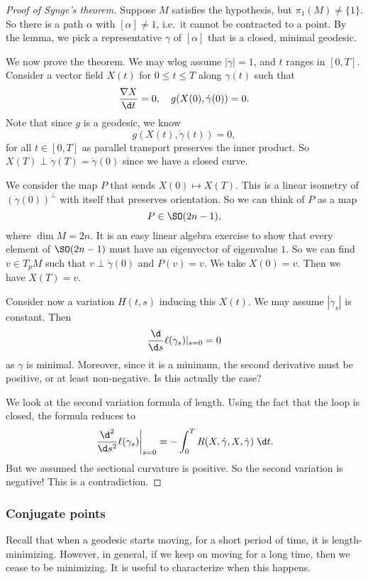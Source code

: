\documentclass[a4paper]{article}
\begin{document}
\begin{proof}[Proof of Synge's theorem]
  Suppose $M$ satisfies the hypothesis, but $\pi_1(M) \not= \{1\}$. So there is a path $\alpha$ with $[\alpha] \not= 1$, i.e.\ it cannot be contracted to a point. By the lemma, we pick a representative $\gamma$ of $[\alpha]$ that is a closed, minimal geodesic.

  We now prove the theorem. We may wlog assume $|\dot{\gamma}| = 1$, and $t$ ranges in $[0, T]$. Consider a vector field $X(t)$ for $0 \leq t \leq T$ along $\gamma(t)$ such that
  \[
    \frac{\nabla X}{\d t} = 0,\quad g(X(0), \dot{\gamma}(0)) = 0.
  \]
  Note that since $g$ is a geodesic, we know
  \[
    g(X(t), \dot{\gamma}(t)) = 0,
  \]
  for all $t \in [0, T]$ as parallel transport preserves the inner product. So $X(T) \perp \dot{\gamma}(T) = \dot{\gamma}(0)$ since we have a closed curve.

  We consider the map $P$ that sends $X(0) \mapsto X(T)$. This is a linear isometry of $(\dot{\gamma}(0))^\perp$ with itself that preserves orientation. So we can think of $P$ as a map
  \[
    P \in \SO(2n - 1),
  \]
  where $\dim M = 2n$. It is an easy linear algebra exercise to show that every element of $\SO(2n - 1)$ must have an eigenvector of eigenvalue $1$. So we can find $v \in T_p M$ such that $v \perp \dot{\gamma}(0)$ and $P(v) = v$. We take $X(0) = v$. Then we have $X(T) = v$.

  Consider now a variation $H(t, s)$ inducing this $X(t)$. We may assume $|\dot{\gamma}_s|$ is constant. Then
  \[
    \frac{\d}{\d s} \ell(\gamma_s)|_{s = 0} = 0
  \]
  as $\gamma$ is minimal. Moreover, since it is a minimum, the second derivative must be positive, or at least non-negative. Is this actually the case?

  We look at the second variation formula of length. Using the fact that the loop is closed, the formula reduces to
  \[
    \left.\frac{\d^2}{\d s^2} \ell(\gamma_s)\right|_{s = 0} = - \int_0^T R(X, \dot{\gamma}, X, \dot{\gamma})\;\d t.
  \]
  But we assumed the sectional curvature is positive. So the second variation is negative! This is a contradiction.
\end{proof}

\subsubsection*{Conjugate points}
Recall that when a geodesic starts moving, for a short period of time, it is length-minimizing. However, in general, if we keep on moving for a long time, then we cease to be minimizing. It is useful to characterize when this happens.
\end{document}
